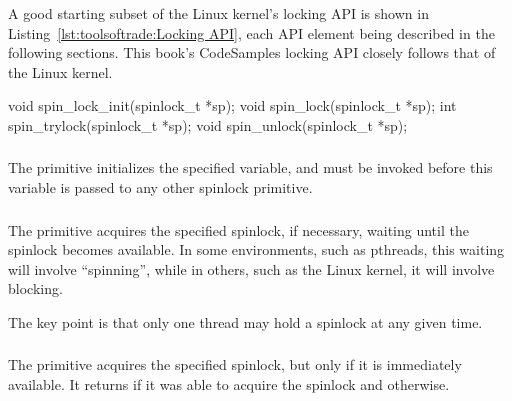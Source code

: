 A good starting subset of the Linux kernel's locking API is shown in
Listing~\ref{lst:toolsoftrade:Locking API},
each API element being described in the following sections.
This book's CodeSamples locking API closely follows that of the Linux kernel.

\begin{listing}[tbp]
\begin{VerbatimL}[numbers=none]
void spin_lock_init(spinlock_t *sp);
void spin_lock(spinlock_t *sp);
int spin_trylock(spinlock_t *sp);
void spin_unlock(spinlock_t *sp);
\end{VerbatimL}
\caption{Locking API}
\label{lst:toolsoftrade:Locking API}
\end{listing}

\subsubsection{}

The  primitive initializes the specified
 variable, and must be invoked before
this variable is passed to any other spinlock primitive.

\subsubsection{}

The  primitive acquires the specified spinlock,
if necessary, waiting until the spinlock becomes available.
In some environments, such as pthreads, this waiting will involve
``spinning'', while
in others, such as the Linux kernel, it will involve blocking.

The key point is that only one thread may hold a spinlock at any
given time.

\subsubsection{}

The  primitive acquires the specified spinlock,
but only if it is immediately available.
It returns  if it was able to acquire the spinlock and
 otherwise.

\subsubsection{}

